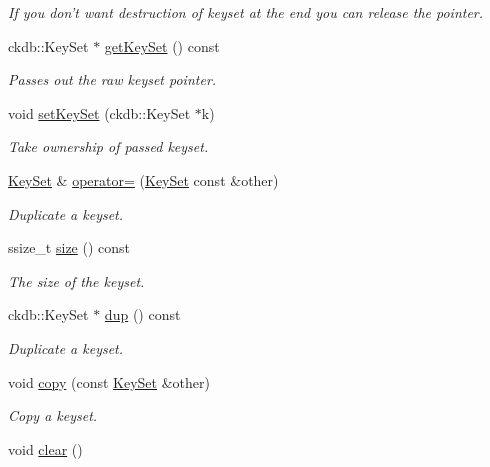 \begin{DoxyCompactItemize}
\begin{DoxyCompactList}\small\item\em If you don't want destruction of keyset at the end you can release the pointer. \end{DoxyCompactList}\item 
ckdb\-::\-Key\-Set $\ast$ \hyperlink{classkdb_1_1KeySet_aa79bbbfb6e2f3e9c48cb3e595f9cda51}{get\-Key\-Set} () const 
\begin{DoxyCompactList}\small\item\em Passes out the raw keyset pointer. \end{DoxyCompactList}\item 
void \hyperlink{classkdb_1_1KeySet_a9f3ec4eebe304185527b08a6fa01b77c}{set\-Key\-Set} (ckdb\-::\-Key\-Set $\ast$k)
\begin{DoxyCompactList}\small\item\em Take ownership of passed keyset. \end{DoxyCompactList}\item 
\hyperlink{classkdb_1_1KeySet}{Key\-Set} \& \hyperlink{classkdb_1_1KeySet_a1c54736b7206bc2253d02a5bf4b3ccfb}{operator=} (\hyperlink{classkdb_1_1KeySet}{Key\-Set} const \&other)
\begin{DoxyCompactList}\small\item\em Duplicate a keyset. \end{DoxyCompactList}\item 
ssize\-\_\-t \hyperlink{classkdb_1_1KeySet_a18b332fe23a7f793f80f9b22b5727584}{size} () const 
\begin{DoxyCompactList}\small\item\em The size of the keyset. \end{DoxyCompactList}\item 
ckdb\-::\-Key\-Set $\ast$ \hyperlink{classkdb_1_1KeySet_a72d0b50194fb1900c468b53e749369a2}{dup} () const 
\begin{DoxyCompactList}\small\item\em Duplicate a keyset. \end{DoxyCompactList}\item 
void \hyperlink{classkdb_1_1KeySet_a28fd33fdaecf1d57d4dddac7058f5d38}{copy} (const \hyperlink{classkdb_1_1KeySet}{Key\-Set} \&other)
\begin{DoxyCompactList}\small\item\em Copy a keyset. \end{DoxyCompactList}\item 
void \hyperlink{classkdb_1_1KeySet_a38f5159e39758aa632421d2fe7440633}{clear} ()

\end{DoxyCompactItemize}
